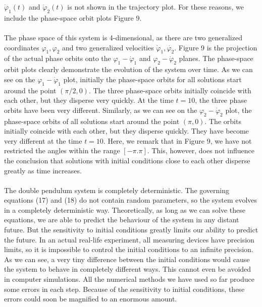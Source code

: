 \documentclass[11pt]{article}
\begin{document}
\(\dot{\varphi}_1(t)\) and \(\dot{\varphi}_2(t)\) is not shown in the trajectory plot. For these reasons, we include the
phase-space orbit plots Figure 9. \\
\\
The phase space of this system is 4-dimensional, as there are two generalized coordinates \(\varphi_1, \varphi_2\) and two
generalized velocities \(\dot{\varphi}_1, \dot{\varphi_2}\). Figure 9 is the projection of
the actual phase orbits onto the \(\varphi_1 - \dot{\varphi}_1\) and \(\varphi_2 - \dot{\varphi}_2\) planes.
The phase-space orbit plots clearly demonstrate the evolution of the system over time.
As we can see on the \(\varphi_1 - \dot{\varphi}_1\) plot, initially the phase-space orbits for all solutions
start around the point \((\pi/2, 0)\). The three phase-space orbits initially coincide with each other, but they disperse
very quickly. At the time \(t=10\), the three phase orbits have been very different.
Similarly, as we can see on the \(\varphi_2 - \dot{\varphi}_2\) plot,
the phase-space orbits of all solutions start around the point \((\pi, 0)\).
The orbits initially coincide with each other, but they disperse quickly.
They have become very different at the time \(t=10\). Here, we remark that in Figure 9, we have
not restricted the angles within the range \([-\pi. \pi]\). This, however, does not influence the conclusion
that solutions with initial conditions close to each other disperse greatly as time increases. \\
\\
The double pendulum system is completely deterministic. The governing equations (17) and (18) do not contain random
parameters, so the system evolves in a completely deterministic way. Theoretically, as long as we can solve these equations, we are able to predict the behaviour of the
system in any distant future. But the sensitivity to initial conditions greatly limits our ability to predict the future.
In an actual real-life experiment, all measuring devices have precision limits, so it is impossible to control
the initial conditions to an infinite precision. As we can see, a very tiny difference between the initial conditions
would cause the system to behave in completely different ways. This cannot even be avoided in computer simulations.
All the numerical methods we have used so far produce some errors in each step.
Because of the sensitivity to initial conditions, these errors could soon be magnified to an enormous amount.
\end{document}

